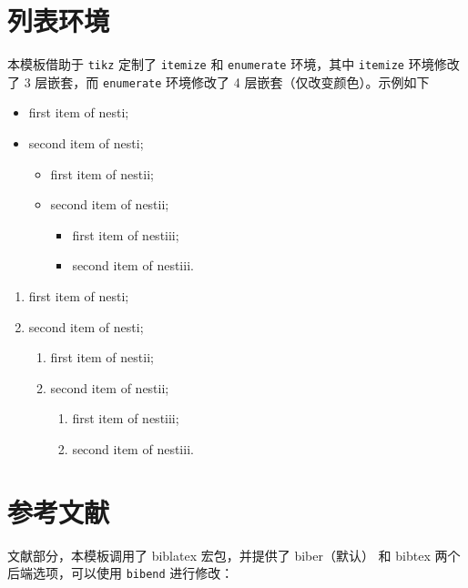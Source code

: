 \documentclass[lang=cn,10pt]{elegantbook}
\begin{document}
\section{列表环境}
本模板借助于 \lstinline{tikz} 定制了 \lstinline{itemize} 和 \lstinline{enumerate} 环境，其中 \lstinline{itemize} 环境修改了 3 层嵌套，而 \lstinline{enumerate} 环境修改了 4 层嵌套（仅改变颜色）。示例如下\\[2ex]
\begin{minipage}[b]{0.49\textwidth}
  \begin{itemize}
    \item first item of nesti;
    \item second item of nesti;
      \begin{itemize}
        \item first item of nestii;
        \item second item of nestii;
        \begin{itemize}
          \item first item of nestiii;
          \item second item of nestiii.
        \end{itemize}   
      \end{itemize}
  \end{itemize}
\end{minipage}
\begin{minipage}[b]{0.49\textwidth}
  \begin{enumerate}
    \item first item of nesti;
    \item second item of nesti;
      \begin{enumerate}
        \item first item of nestii;
        \item second item of nestii;
        \begin{enumerate}
          \item first item of nestiii;
          \item second item of nestiii.
        \end{enumerate}   
      \end{enumerate}
  \end{enumerate}
\end{minipage}



\section{参考文献}
文献部分，本模板调用了 biblatex 宏包，并提供了 biber（默认） 和 bibtex 两个后端选项，可以使用 \lstinline{bibend} 进行修改：
\end{document}
